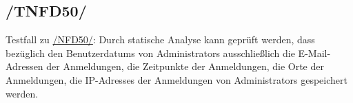 \subsection*{/TNFD50/}
\label{/TNFD50/} Testfall zu \hyperref[/NFD50/]{/NFD50/}: Durch \gls{statische Analyse} kann geprüft werden, dass bezüglich den \Glspl{Benutzerdatum} von \Glspl{Administrator} ausschließlich die E-Mail-Adressen der Anmeldungen, die Zeitpunkte der Anmeldungen, die Orte der Anmeldungen, die \Glspl{IP-Adresse} der Anmeldungen von \Glspl{Administrator} gespeichert werden.